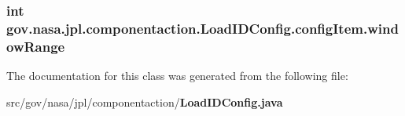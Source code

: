 \subsubsection[{window\+Range}]{\setlength{\rightskip}{0pt plus 5cm}int gov.\+nasa.\+jpl.\+componentaction.\+Load\+I\+D\+Config.\+config\+Item.\+window\+Range\hspace{0.3cm}{\ttfamily [package]}}\label{classgov_1_1nasa_1_1jpl_1_1componentaction_1_1_load_i_d_config_1_1config_item_ae8642cf0f020519eb9357dca404e61ce}


The documentation for this class was generated from the following file\+:\begin{DoxyCompactItemize}
\item 
src/gov/nasa/jpl/componentaction/{\bf Load\+I\+D\+Config.\+java}\end{DoxyCompactItemize}
